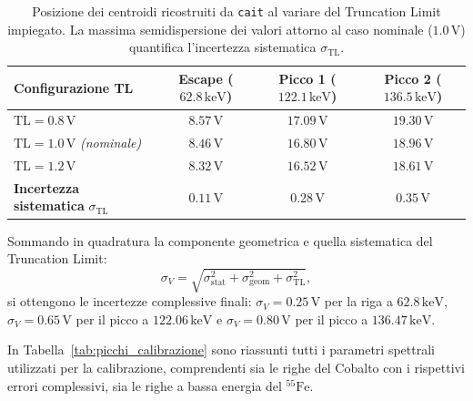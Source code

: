 \begin{table}[htbp]
    \centering
    \small
    \renewcommand{\arraystretch}{1.2}
    \begin{tabular}{lccc}
        \hline\hline
        \textbf{Configurazione TL} & \textbf{Escape} ($62.8\,\text{keV}$) & \textbf{Picco 1} ($122.1\,\text{keV}$) & \textbf{Picco 2} ($136.5\,\text{keV}$) \\
        \hline
        $\text{TL} = 0.8\,\text{V}$ & $8.57\,\text{V}$ & $17.09\,\text{V}$ & $19.30\,\text{V}$ \\
        $\text{TL} = 1.0\,\text{V}$ \textit{(nominale)} & $8.46\,\text{V}$ & $16.80\,\text{V}$ & $18.96\,\text{V}$ \\
        $\text{TL} = 1.2\,\text{V}$ & $8.32\,\text{V}$ & $16.52\,\text{V}$ & $18.61\,\text{V}$ \\
        \hline
        \textbf{Incertezza sistematica} $\sigma_{\text{TL}}$ & $0.11\,\text{V}$ & $0.28\,\text{V}$ & $0.35\,\text{V}$ \\
        \hline\hline
    \end{tabular}
    \caption{Posizione dei centroidi ricostruiti da \texttt{cait} al variare del Truncation Limit impiegato. La massima semidispersione dei valori attorno al caso nominale ($1.0\,\text{V}$) quantifica l'incertezza sistematica $\sigma_{\text{TL}}$.}
    \label{tab:variazione_tl}
\end{table}

Sommando in quadratura la componente geometrica e quella sistematica del Truncation Limit:
\begin{equation}
    \sigma_V = \sqrt{\sigma_{\text{stat}}^2 + \sigma_{\text{geom}}^2 + \sigma_{\text{TL}}^2},
\end{equation}
si ottengono le incertezze complessive finali: $\sigma_V = 0.25\,\text{V}$ per la riga a $62.8\,\text{keV}$, $\sigma_V = 0.65\,\text{V}$ per il picco a $122.06\,\text{keV}$ e $\sigma_V = 0.80\,\text{V}$ per il picco a $136.47\,\text{keV}$.

In Tabella~\ref{tab:picchi_calibrazione} sono riassunti tutti i parametri spettrali utilizzati per la calibrazione, comprendenti sia le righe del Cobalto con i rispettivi errori complessivi, sia le righe a bassa energia del $^{55}\text{Fe}$.

